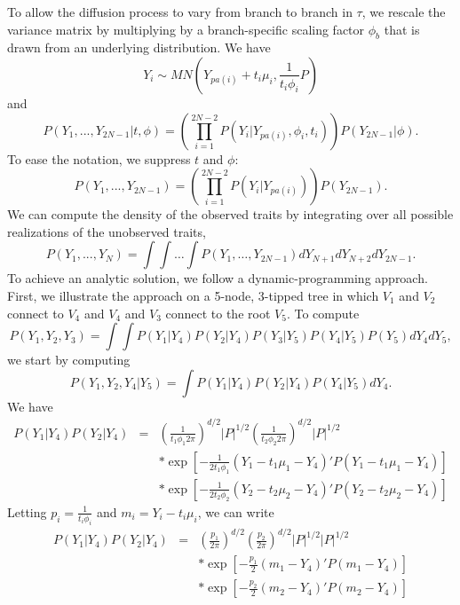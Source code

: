\documentclass[12pt]{article}
\begin{document}
To allow the diffusion process to vary from branch to branch in $\tau$, we rescale the variance matrix by multiplying
by a branch-specific scaling factor $\phi_b$ that is drawn from an underlying distribution.
We have
\begin{equation}
Y_i \sim MN \left( Y_{pa(i)} + t_i \mu_i, \frac{1}{t_i \phi_i}P \right)
\end{equation}
and
\begin{equation}
P(Y_1,...,Y_{2N-1} |t,\phi ) = \left(  \prod_{i=1}^{2N-2} P(Y_i | Y_{pa(i)},\phi_i,t_i) \right) P(Y_{2N-1} | \phi).
\end{equation}
To ease the notation, we suppress $t$ and $\phi$:
\begin{equation}
P(Y_1,...,Y_{2N-1}) = \left(  \prod_{i=1}^{2N-2} P(Y_i | Y_{pa(i)}) \right) P(Y_{2N-1} ).
\end{equation}
We can compute the density of the observed traits by integrating over all possible realizations of the
unobserved traits,
\begin{equation}
P(Y_1,...,Y_N) = \int \int \dots \int P(Y_1, \dots, Y_{2N-1}) dY_{N+1} dY_{N+2} dY_{2N-1}.
\end{equation}
To achieve an analytic solution, we follow a dynamic-programming approach.  First, we illustrate the approach on a
5-node, 3-tipped tree in which $V_1$ and $V_2$ connect to $V_4$ and $V_4$ and $V_3$ connect to the root $V_5$.  
To compute
\begin{equation}
P(Y_1,Y_2,Y_3) = \int \int P(Y_1 | Y_4) P(Y_2 | Y_4)  P(Y_3 | Y_5) P(Y_4 | Y_5) P(Y_5) dY_4 dY_5 ,
\end{equation}
we start by computing
\begin{equation}
P(Y_1,Y_2,Y_4 | Y_5) = \int  P(Y_1 | Y_4) P(Y_2 | Y_4) P(Y_4 | Y_5) dY_4.
\end{equation}
We have
\begin{eqnarray}
P(Y_1 | Y_4) P(Y_2 | Y_4 ) & = & \left( \frac{1}{t_1 \phi_1 2 \pi} \right) ^{d/2} |P|^{1/2}  \left( \frac{1}{t_2 \phi_2 2 \pi} \right) ^{d/2} |P|^{1/2} \\
& & * \exp \left[ -\frac{1}{2t_1 \phi_1} \left( Y_1 - t_1 \mu_1 - Y_4  \right)' P \left( Y_1 - t_1 \mu_1 - Y_4  \right)   \right] \\
& & * \exp \left[ -\frac{1}{2t_2 \phi_2} \left(Y_2 - t_2 \mu_2 - Y_4 \right)' P \left( Y_2 - t_2 \mu_2 - Y_4  \right)   \right]
\end{eqnarray}
Letting $p_i = \frac{1}{t_i \phi_i}$ and $m_i = Y_i - t_i \mu_i$, we can write
\begin{eqnarray}
P(Y_1 | Y_4) P(Y_2 | Y_4 ) & = & \left( \frac{p_1}{2 \pi} \right) ^{d/2}  \left( \frac{p_2}{2 \pi} \right) ^{d/2} |P|^{1/2} |P|^{1/2}  \\
& & * \exp \left[ -\frac{p_1}{2} \left( m_1  - Y_4  \right)' P \left( m_1 - Y_4  \right)  \right] \\
 & & * \exp \left[ -\frac{p_2}{2} \left(m_2 - Y_4 \right)' P \left( m_2 - Y_4  \right)   \right]
\end{eqnarray}
\end{document}

